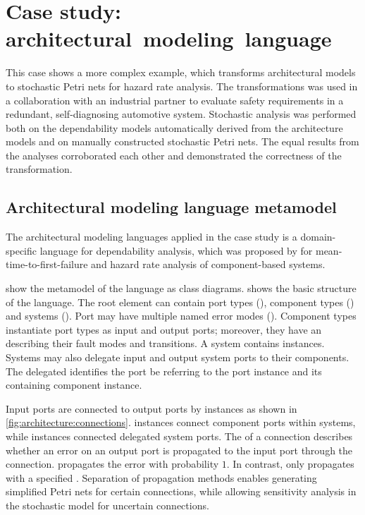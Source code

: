 \chapter{Case study: architectural~modeling~language}
\label{app:architecture}

This case shows a more complex example, which transforms architectural models to stochastic Petri nets for hazard rate analysis. The transformations was used in a collaboration with an industrial partner to evaluate safety requirements in a redundant, self-diagnosing automotive system. Stochastic analysis was performed both on the dependability models automatically derived from the architecture models and on manually constructed stochastic Petri nets. The equal results from the analyses corroborated each other and demonstrated the correctness of the transformation.

\section{Architectural modeling language metamodel}

The architectural modeling languages applied in the case study is a domain-specific language for dependability analysis, which was proposed by \citet{Ecsedi16architecture} for mean-time-to-first-failure and hazard rate analysis of component-based systems.

 show the metamodel of the language as class diagrams.  shows the basic structure of the language. The root element  can contain port types (), component types () and systems (). Port may have multiple named error modes (). Component types instantiate port types as input and output ports; moreover, they have an  describing their fault modes and transitions. A system contains  instances. Systems may also delegate input and output system ports to their components. The delegated  identifies the port be referring to the port instance and its containing component instance.

Input ports are connected to output ports by  instances as shown in \vref{fig:architecture:connections}.  instances connect component ports within systems, while  instances connected delegated system ports. The  of a connection describes whether an error on an output port is propagated to the input port through the connection.  propagates the error with probability \(1\). In contrast,  only propagates with a specified . Separation of propagation methods enables generating simplified Petri nets for certain connections, while allowing sensitivity analysis in the stochastic model for uncertain connections. 

